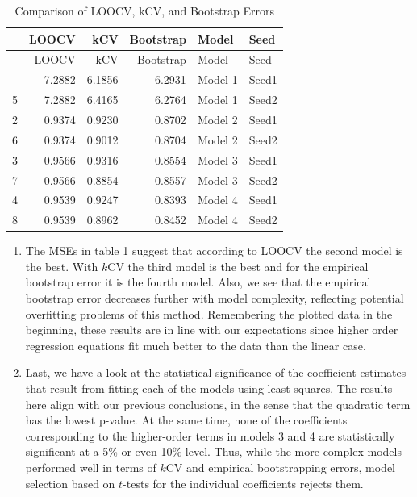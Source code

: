 \documentclass[
]{article}
\begin{document}
\begin{longtable}[]{@{}lrrrll@{}}
\caption{Comparison of LOOCV, kCV, and Bootstrap Errors}\tabularnewline
\toprule\noalign{}
& LOOCV & kCV & Bootstrap & Model & Seed \\
\midrule\noalign{}
\endfirsthead
\toprule\noalign{}
& LOOCV & kCV & Bootstrap & Model & Seed \\
\midrule\noalign{}
\endhead
\bottomrule\noalign{}
\endlastfoot
1 & 7.2882 & 6.1856 & 6.2931 & Model 1 & Seed1 \\
5 & 7.2882 & 6.4165 & 6.2764 & Model 1 & Seed2 \\
2 & 0.9374 & 0.9230 & 0.8702 & Model 2 & Seed1 \\
6 & 0.9374 & 0.9012 & 0.8704 & Model 2 & Seed2 \\
3 & 0.9566 & 0.9316 & 0.8554 & Model 3 & Seed1 \\
7 & 0.9566 & 0.8854 & 0.8557 & Model 3 & Seed2 \\
4 & 0.9539 & 0.9247 & 0.8393 & Model 4 & Seed1 \\
8 & 0.9539 & 0.8962 & 0.8452 & Model 4 & Seed2 \\
\end{longtable}

\begin{enumerate}
\def\labelenumi{(\alph{enumi})}
\setcounter{enumi}{3}
\item
  The MSEs in table 1 suggest that according to LOOCV the second model
  is the best. With \(k\)CV the third model is the best and for the
  empirical bootstrap error it is the fourth model. Also, we see that
  the empirical bootstrap error decreases further with model complexity,
  reflecting potential overfitting problems of this method. Remembering
  the plotted data in the beginning, these results are in line with our
  expectations since higher order regression equations fit much better
  to the data than the linear case.
\item
  Last, we have a look at the statistical significance of the
  coefficient estimates that result from fitting each of the models
  using least squares. The results here align with our previous
  conclusions, in the sense that the quadratic term has the lowest
  p-value. At the same time, none of the coefficients corresponding to
  the higher-order terms in models 3 and 4 are statistically significant
  at a 5\% or even 10\% level. Thus, while the more complex models
  performed well in terms of \(k\)CV and empirical bootstrapping errors,
  model selection based on \(t\)-tests for the individual coefficients
  rejects them.
\end{enumerate}
\end{document}

